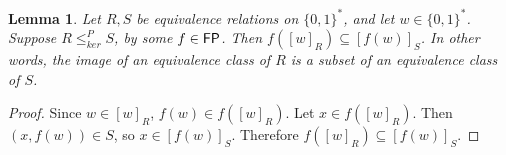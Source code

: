 \documentclass{article}
\newtheorem{theorem}{Theorem}[section]
\newtheorem{lemma}[lemma]{Lemma}
\theoremstyle{definition} \newtheorem{definition}[definition]{Definition}
\newcommand{\sigmastar}{\{0, 1\}^{*}} %
\newcommand{\kr}{\leq^{P}_{ker}} %
\newcommand{\pair}[2]{\langle#1,#2\rangle} %
\begin{document}





\begin{lemma}\label{lem:image}
  Let $R,S$ be equivalence relations on $\sigmastar$, and let
  $w\in\sigmastar$. Suppose $R\kr S$, by some $f\in{\ensuremath{\mathsf{FP}}}$. Then
  $f([w]_R)\subseteq [f(w)]_S$. In other words, the image of an equivalence
  class of $R$ is a subset of an equivalence class of $S$.
\end{lemma}
\begin{proof}
  Since $w\in [w]_R$, $f(w)\in f([w]_R)$. Let $x\in f([w]_R)$. Then $(x,
  f(w))\in S$, so $x\in [f(w)]_S$. Therefore $f([w]_R)\subseteq [f(w)]_S$.
\end{proof}
\end{document}
